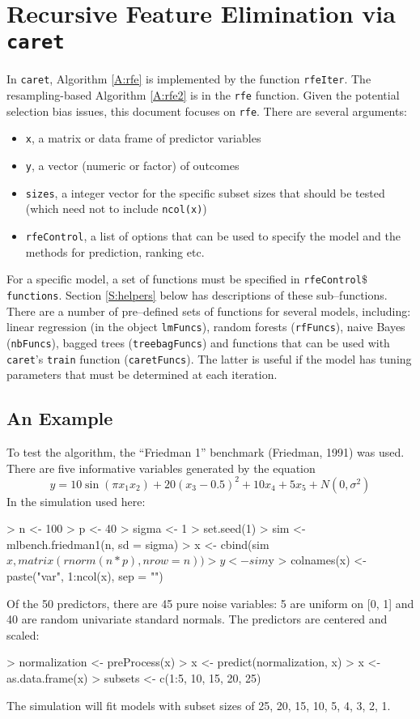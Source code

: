 \documentclass[12pt]{article}
\begin{document}
\clearpage
\section{Recursive Feature Elimination via \texttt{caret}}

In \texttt{caret}, Algorithm \ref{A:rfe} is implemented by the function \texttt{rfeIter}. The resampling-based Algorithm \ref{A:rfe2} is in the \texttt{rfe} function. Given the potential selection bias issues, this document focuses on \texttt{rfe}.  There are several arguments:
\begin{itemize}
\item \texttt{x}, a matrix or data frame of predictor variables
\item \texttt{y}, a vector (numeric or factor) of outcomes
\item \texttt{sizes}, a integer vector for the specific subset sizes that should be tested (which need not to include \texttt{ncol(x)}) 
\item \texttt{rfeControl}, a list of options that can be used to specify the model and the methods for prediction, ranking etc.
\end{itemize}
For a specific model, a set of functions must be specified in \texttt{rfeControl$\$$functions}. Section \ref{S:helpers} below has descriptions of these sub--functions. There are a number of pre--defined sets of functions for several models, including: linear regression (in the object \texttt{lmFuncs}), random forests (\texttt{rfFuncs}), naive Bayes (\texttt{nbFuncs}), bagged trees (\texttt{treebagFuncs}) and functions that can be used with \texttt{caret}'s \texttt{train} function (\texttt{caretFuncs}). The latter is useful if the model has tuning parameters that must be determined at each iteration.


\subsection{An Example}


To test the algorithm, the ``Friedman 1'' benchmark (Friedman, 1991) was used. There are five informative variables generated by the equation
\[
y = 10 \sin(\pi x_1x_2) + 20 (x_3 - 0.5)^2 + 10 x_4 + 5 x_5 + N(0, \sigma^2)
\]
In the simulation used here:
\begin{Schunk}
\begin{Sinput}
> n <- 100
> p <- 40
> sigma <- 1
> set.seed(1)
> sim <- mlbench.friedman1(n, sd = sigma)
> x <- cbind(sim$x,  matrix(rnorm(n * p), nrow = n))
> y <- sim$y
> colnames(x) <- paste("var", 1:ncol(x), sep = "")
\end{Sinput}
\end{Schunk}
Of the 50 predictors, there are 45 pure noise variables: 5 are uniform on [0, 1] and 40 are random univariate standard normals. The predictors are centered and scaled:
\begin{Schunk}
\begin{Sinput}
> normalization <- preProcess(x)
> x <- predict(normalization, x)
> x <- as.data.frame(x)
> subsets <- c(1:5, 10, 15, 20, 25)
\end{Sinput}
\end{Schunk}
The simulation will fit models with subset sizes of 25, 20, 15, 10, 5, 4, 3, 2, 1. 
\end{document}
